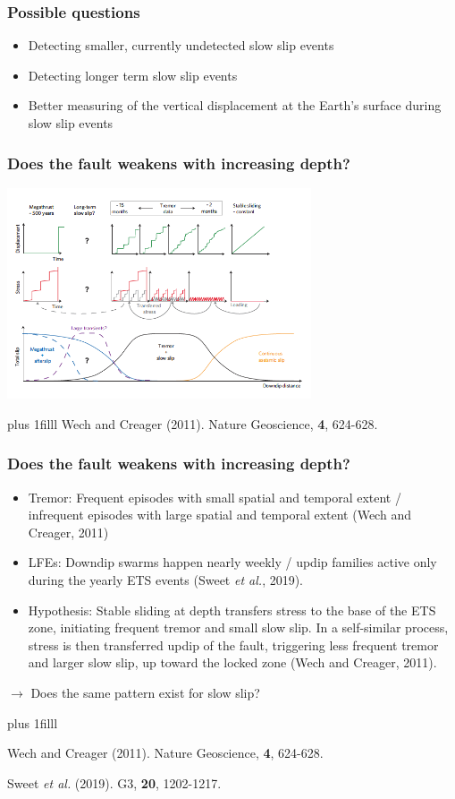 \documentclass{beamer}
\newcommand{\btVFill}{\vskip0pt plus 1filll}
\begin{document}
	\begin{frame}
		\frametitle{Possible questions}
		\begin{itemize}
			\item Detecting smaller, currently undetected slow slip events
			\item Detecting longer term slow slip events
			\item Better measuring of the vertical displacement at the Earth’s surface during slow slip events
		\end{itemize}
	\end{frame}

	\begin{frame}
		\frametitle{Does the fault weakens with increasing depth?}
		\begin{center}
			\includegraphics[trim={0cm 0cm 0cm 0cm}, clip, width=9cm]{articles/wech_creager_2011_3.png}
		\end{center}
		\btVFill
		\tiny{Wech and Creager (2011). Nature Geoscience, \textbf{4}, 624-628.}
	\end{frame}

	\begin{frame}
		\frametitle{Does the fault weakens with increasing depth?}
		\begin{itemize}
			\item Tremor: Frequent episodes with small spatial and temporal extent / infrequent episodes with large spatial and temporal extent (Wech and Creager, 2011)
			\item LFEs: Downdip swarms happen nearly weekly / updip families active only during the yearly ETS events (Sweet \textit{et al.}, 2019).
			\item Hypothesis: Stable sliding at depth transfers stress to the base of the ETS zone, initiating frequent tremor and small slow slip. In a self-similar process, stress is then transferred updip of the fault, triggering less frequent tremor and larger slow slip, up toward the locked zone (Wech and Creager, 2011).
		\end{itemize}
		\begin{block}{}
			$\rightarrow$ Does the same pattern exist for slow slip?
		\end{block}
		\btVFill
		\tiny{Wech and Creager (2011). Nature Geoscience, \textbf{4}, 624-628.

		Sweet \textit{et al.} (2019). G3, \textbf{20}, 1202-1217.}
	\end{frame}
\end{document}
